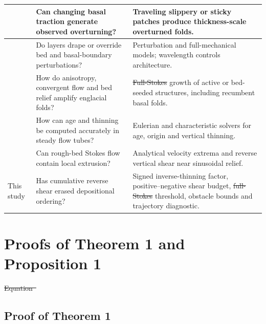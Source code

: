\documentclass[review]{igs}
\providecommand{\DIFadd}[1]{{\protect\color{blue}\uwave{#1}}} %
\providecommand{\DIFdel}[1]{{\protect\color{red}\sout{#1}}}                      %
\providecommand{\DIFaddbegin}{} %
\providecommand{\DIFaddend}{} %
\providecommand{\DIFdelbegin}{} %
\providecommand{\DIFdelend}{} %
\newcommand{\DIFscaledelfig}{0.5}
\newlength{\DIFdelgraphicswidth} %
\newlength{\DIFdelgraphicsheight} %
\newcommand{\DIFaddincludegraphics}[2][]{{\color{blue}\fbox{\DIFOincludegraphics[#1]{#2}}}} %
\newcommand{\DIFdelincludegraphics}[2][]{%
\sbox{\DIFdelgraphicsbox}{\DIFOincludegraphics[#1]{#2}}%
\settoboxwidth{\DIFdelgraphicswidth}{\DIFdelgraphicsbox} %
\settoboxtotalheight{\DIFdelgraphicsheight}{\DIFdelgraphicsbox} %
\scalebox{\DIFscaledelfig}{%
\parbox[b]{\DIFdelgraphicswidth}{\usebox{\DIFdelgraphicsbox}\\[-\baselineskip] \rule{\DIFdelgraphicswidth}{0em}}\llap{\resizebox{\DIFdelgraphicswidth}{\DIFdelgraphicsheight}{%
\setlength{\unitlength}{\DIFdelgraphicswidth}%
\begin{picture}(1,1)%
\thicklines\linethickness{2pt} %
{\color[rgb]{1,0,0}\put(0,0){\framebox(1,1){}}}%
{\color[rgb]{1,0,0}\put(0,0){\line( 1,1){1}}}%
{\color[rgb]{1,0,0}\put(0,1){\line(1,-1){1}}}%
\end{picture}%
}\hspace*{3pt}}} %
} %
\DeclareRobustCommand{\DIFaddbegin}{\DIFOaddbegin \let\includegraphics\DIFaddincludegraphics} %
\DeclareRobustCommand{\DIFaddend}{\DIFOaddend \let\includegraphics\DIFOincludegraphics} %
\DeclareRobustCommand{\DIFdelbegin}{\DIFOdelbegin \let\includegraphics\DIFdelincludegraphics} %
\DeclareRobustCommand{\DIFdelend}{\DIFOaddend \let\includegraphics\DIFOincludegraphics} %
\begin{document}
\begin{longtable}{@{}p{}p{}p{}@{}}
\midrule
\citet{Wolovick2014,WolovickCreyts2016} & Can changing basal traction generate observed overturning? & Traveling slippery or sticky patches produce thickness-scale overturned folds. \\
\midrule
\citet{Hindmarsh2006} & Do layers drape or override bed and basal-boundary perturbations? & Perturbation and full-mechanical models; wavelength controls architecture. \\
\midrule
\citet{Zhang2024} & How do anisotropy, convergent flow and bed relief amplify englacial folds? & \DIFdelbegin \DIFdel{Full-Stokes }\DIFdelend \DIFaddbegin \DIFadd{Stokes }\DIFaddend growth of active or bed-seeded structures, including recumbent basal folds. \\
\midrule
\citet{HindmarshLeysingerVieliParrenin2009,ParreninChungMartin2025} & How can age and thinning be computed accurately in steady flow tubes? & Eulerian and characteristic solvers for age, origin and vertical thinning. \\
\midrule
\citet{Gudmundsson1997linear} & Can rough-bed Stokes flow contain local extrusion? & Analytical velocity extrema and reverse vertical shear near sinusoidal relief. \\
\midrule
This study & Has cumulative reverse shear erased depositional ordering? & Signed inverse-thinning factor, positive--negative shear budget, \DIFdelbegin \DIFdel{full-Stokes }\DIFdelend \DIFaddbegin \DIFadd{Stokes }\DIFaddend threshold, obstacle bounds and trajectory diagnostic. \\
\end{longtable}
\endgroup

\DIFdelbegin %
\DIFdelend \DIFaddbegin \section{Proofs of Theorem 1 and Proposition 1}
\label{app:proofs}
\DIFaddend 

\DIFdelbegin \DIFdel{Equation~}\DIFdelend \DIFaddbegin \subsection{Proof of Theorem 1}
\end{document}
